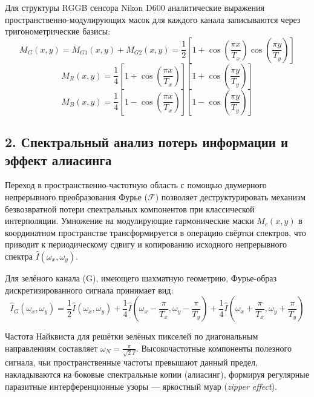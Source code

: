\documentclass[12pt,a4paper]{article}
\begin{document}
Для структуры RGGB сенсора Nikon D600 аналитические выражения пространственно-модулирующих масок для каждого канала записываются через тригонометрические базисы:
\begin{equation}
M_G(x, y) = M_{G1}(x,y) + M_{G2}(x,y) = \frac{1}{2} \left[ 1 + \cos\left(\frac{\pi x}{T_x}\right)\cos\left(\frac{\pi y}{T_y}\right) \right]
\end{equation}
\begin{equation}
M_R(x, y) = \frac{1}{4} \left[ 1 + \cos\left(\frac{\pi x}{T_x}\right) \right] \left[ 1 + \cos\left(\frac{\pi y}{T_y}\right) \right]
\end{equation}
\begin{equation}
M_B(x, y) = \frac{1}{4} \left[ 1 - \cos\left(\frac{\pi x}{T_x}\right) \right] \left[ 1 - \cos\left(\frac{\pi y}{T_y}\right) \right]
\end{equation}

\subsection*{2. Спектральный анализ потерь информации и эффект алиасинга}

Переход в пространственно-частотную область с помощью двумерного непрерывного преобразования Фурье ($\mathcal{F}$) позволяет деструктурировать механизм безвозвратной потери спектральных компонентов при классической интерполяции. Умножение на модулирующие гармонические маски $M_c(x,y)$ в координатном пространстве трансформируется в операцию свёртки спектров, что приводит к периодическому сдвигу и копированию исходного непрерывного спектра $\hat{I}(\omega_x, \omega_y)$.

Для зелёного канала (G), имеющего шахматную геометрию, Фурье-образ дискретизированного сигнала принимает вид:
\begin{equation}
\hat{I}_G(\omega_x, \omega_y) = \frac{1}{2}\hat{I}(\omega_x, \omega_y) + \frac{1}{4}\hat{I}\left(\omega_x - \frac{\pi}{T_x}, \omega_y - \frac{\pi}{T_y}\right) + \frac{1}{4}\hat{I}\left(\omega_x + \frac{\pi}{T_x}, \omega_y + \frac{\pi}{T_y}\right)
\end{equation}

Частота Найквиста для решётки зелёных пикселей по диагональным направлениям составляет $\omega_N = \frac{\pi}{\sqrt{2}T}$. Высокочастотные компоненты полезного сигнала, чьи пространственные частоты превышают данный предел, накладываются на боковые спектральные копии (алиасинг), формируя регулярные паразитные интерференционные узоры --- яркостный муар (\textit{zipper effect}).
\end{document}
